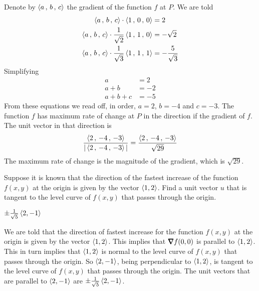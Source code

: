 \begin{solution}
Denote by $\left< a\,,\,b\,,\,c\right>$ the gradient of the function $f$ at
$P$. We are told
\begin{align*}
\left< a\,,\,b\,,\,c\right> \cdot \left< 1\,,\,0\,,\,0\right> &= 2 \\
\left< a\,,\,b\,,\,c\right> \cdot \frac{1}{\sqrt{2}}\left< 1\,,\,1\,,\,0\right> &= -\sqrt{2} \\
\left< a\,,\,b\,,\,c\right> \cdot \frac{1}{\sqrt{3}}\left< 1\,,\,1\,,\,1\right> &= -\frac{5}{\sqrt{3}}
\end{align*}
Simplifying
\begin{align*}
a&=2 \\
a+b&=-2 \\
a+b+c&=-5
\end{align*}
From these equations we read off, in order,
$a=2$, $b=-4$ and $c=-3$.
The function $f$ has maximum rate of change at $P$ in the 
direction if the gradient of $f$. The unit vector in that direction is
\begin{equation*}
\frac{\left< 2\,,\,-4\,,\,-3\right>}{|\left< 2\,,\,-4\,,\,-3\right>|}
=\frac{\left< 2\,,\,-4\,,\,-3\right>}{\sqrt{29}}
\end{equation*}
The maximum rate of change is the magnitude of the gradient, which is
$\sqrt{29}$.
\end{solution}

\begin{question}[M200 2013D] %
Suppose it is known that the direction of the fastest increase of the 
function $f(x,y)$ at the origin is given by the vector $\left< 1, 2\right>$. 
Find a unit vector $u$ that is tangent to the level curve of $f(x,y)$ 
that passes through the origin.
\end{question}

%

\begin{answer}
$\pm\frac{1}{\sqrt{5}}\left< 2, -1\right>$
\end{answer}

\begin{solution}
We are told that the direction of fastest increase for the 
function $f(x,y)$ at the origin is given by the vector $\left< 1, 2\right>$.
This implies that $\vnabla f(0,0)$ is parallel to $\left< 1, 2\right>$.
This in turn implies that $\left< 1, 2\right>$ is normal to the level curve
of $f(x,y)$ that passes through the origin. So $\left< 2, -1\right>$, being 
perpendicular to $\left< 1, 2\right>$,  is tangent to the level curve of 
$f(x,y)$ that passes through the origin.
The unit vectors that are parallel to $\left< 2, -1\right>$
are $\pm\frac{1}{\sqrt{5}}\left< 2, -1\right>$.
\end{solution}

